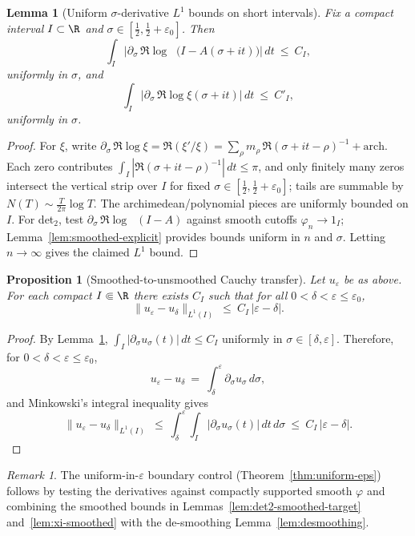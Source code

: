 \documentclass[11pt]{article}
\newtheorem{proposition}[theorem]{Proposition}
\newtheorem{lemma}[theorem]{Lemma}
\theoremstyle{remark}
\newtheorem{remark}[theorem]{Remark}
\DeclareMathOperator{\dettwo}{det_2}
\begin{document}
\begin{lemma}[Uniform \(\sigma\)-derivative $L^1$ bounds on short intervals]\label{lem:uniform-derivative-L1}
Fix a compact interval \(I\subset\R\) and \(\sigma\in[\tfrac12,\tfrac12+\varepsilon_0]\). Then
\[
 \int_I \Big|\partial_\sigma\,\Re\log\dettwo\big(I-A(\sigma+it)\big)\Big|\,dt\ \le\ C_I,
\]
uniformly in \(\sigma\), and
\[
 \int_I \Big|\partial_\sigma\,\Re\log\xi(\sigma+it)\Big|\,dt\ \le\ C'_I,
\]
uniformly in \(\sigma\).
\end{lemma}
\begin{proof}
For \(\xi\), write \(\partial_\sigma\,\Re\log\xi=\Re(\xi'/\xi)=\sum_{\rho} m_{\rho}\,\Re(\sigma+it-\rho)^{-1}+\text{arch}\). Each zero contributes \(\int_I |\Re(\sigma+it-\rho)^{-1}|\,dt\le \pi\), and only finitely many zeros intersect the vertical strip over \(I\) for fixed \(\sigma\in[\tfrac12,\tfrac12+\varepsilon_0]\); tails are summable by \(N(T)\sim \tfrac{T}{2\pi}\log T\). The archimedean/polynomial pieces are uniformly bounded on \(I\). For det$_2$, test \(\partial_\sigma\,\Re\log\dettwo(I-A)\) against smooth cutoffs \(\varphi_n\to 1_I\); Lemma~\ref{lem:smoothed-explicit} provides bounds uniform in \(n\) and \(\sigma\). Letting \(n\to\infty\) gives the claimed \(L^1\) bound.
\end{proof}

\begin{proposition}[Smoothed-to-unsmoothed Cauchy transfer]\label{prop:desmoothing}
Let \(u_\varepsilon\) be as above. For each compact \(I\Subset\R\) there exists \(C_I\) such that for all \(0<\delta<\varepsilon\le\varepsilon_0\),
\[
 \|u_\varepsilon-u_\delta\|_{L^1(I)}\ \le\ C_I\,|\varepsilon-\delta|.
\]
\end{proposition}
\begin{proof}
By Lemma~\ref{lem:uniform-derivative-L1}, \(\int_I |\partial_\sigma u_\sigma(t)|\,dt\le C_I\) uniformly in \(\sigma\in[\delta,\varepsilon]\). Therefore, for \(0<\delta<\varepsilon\le\varepsilon_0\),
\[
 u_\varepsilon-u_\delta\ =\ \int_\delta^\varepsilon \partial_\sigma u_\sigma\,d\sigma,
\]
and Minkowski's integral inequality gives
\[
 \|u_\varepsilon-u_\delta\|_{L^1(I)}\ \le\ \int_\delta^\varepsilon\!\int_I |\partial_\sigma u_\sigma(t)|\,dt\,d\sigma\ \le\ C_I\,|\varepsilon-\delta|.
\]
\end{proof}

\begin{remark}
The uniform-in-\(\varepsilon\) boundary control (Theorem~\ref{thm:uniform-eps}) follows by testing the derivatives against compactly supported smooth \(\varphi\) and combining the smoothed bounds in Lemmas~\ref{lem:det2-smoothed-target} and~\ref{lem:xi-smoothed} with the de-smoothing Lemma~\ref{lem:desmoothing}.
\end{remark}
\end{document}
